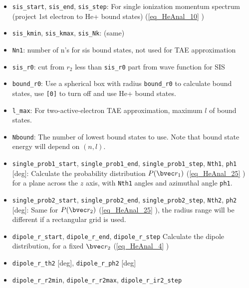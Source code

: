 \begin{itemize}
\item \verb`sis_start`, \verb`sis_end`, \verb`sis_step`: For single ionization momentum spectrum (project 1st electron to He+ bound states) (\autoref{eq_HeAnal_10} )
\item \verb`sis_kmin`, \verb`sis_kmax`, \verb`sis_Nk`: (same)
\item \verb`Nn1`: number of n's for sis bound states, not used for TAE approximation
\item \verb`sis_r0`: cut from $r_2$ less than \verb`sis_r0` part from wave function for SIS
\item \verb`bound_r0`: Use a spherical box with radius \verb`bound_r0` to calculate bound states, use \verb|[0]| to turn off and use He+ bound states.
\item \verb`l_max`: For two-active-electron TAE approximation, maximum $l$ of bound states.
\item \verb`Nbound`: The number of lowest bound states to use. Note that bound state energy will depend on $(n, l)$.

\item \verb`single_prob1_start`, \verb`single_prob1_end`, \verb`single_prob1_step`, \verb`Nth1`, \verb`ph1` [deg]: Calculate the probability distribution $P(\bvec r_1)$ (\autoref{eq_HeAnal_25} ) for a plane across the $z$ axis, with \verb|Nth1| angles and azimuthal angle \verb|ph1|.

\item \verb`single_prob2_start`, \verb`single_prob2_end`, \verb`single_prob2_step`, \verb`Nth2`, \verb`ph2` [deg]: Same for $P(\bvec r_2)$ (\autoref{eq_HeAnal_25} ), the radius range will be different if a rectangular grid is used.
\item \verb`dipole_r_start`, \verb`dipole_r_end`, \verb`dipole_r_step` Calculate the dipole distribution, for a fixed $\bvec r_2$ (\autoref{eq_HeAnal_4} )
\item \verb`dipole_r_th2` [deg], \verb`dipole_r_ph2` [deg]
\item \verb`dipole_r_r2min`, \verb`dipole_r_r2max`, \verb`dipole_r_ir2_step`
\end{itemize}
